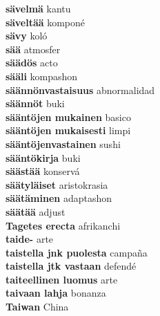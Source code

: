 \textbf{ sävelmä  } kantu \\
\textbf{ säveltää  } komponé \\
\textbf{ sävy  } koló \\
\textbf{ sää  } atmosfer \\
\textbf{ säädös  } acto \\
\textbf{ sääli  } kompashon \\
\textbf{ säännönvastaisuus  } abnormalidad \\
\textbf{ säännöt  } buki \\
\textbf{ sääntöjen mukainen  } basico \\
\textbf{ sääntöjen mukaisesti  } limpi \\
\textbf{ sääntöjenvastainen  } sushi \\
\textbf{ sääntökirja  } buki \\
\textbf{ säästää  } konservá \\
\textbf{ säätyläiset  } aristokrasia \\
\textbf{ säätäminen  } adaptashon \\
\textbf{ säätää  } adjust \\
\textbf{ Tagetes erecta  } afrikanchi \\
\textbf{ taide-  } arte \\
\textbf{ taistella jnk puolesta  } campaña \\
\textbf{ taistella jtk vastaan  } defendé \\
\textbf{ taiteellinen luomus  } arte \\
\textbf{ taivaan lahja  } bonanza \\
\textbf{ Taiwan  } China \\

